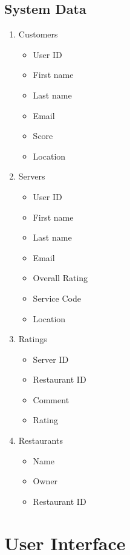 \documentclass{scrreprt}
\begin{document}
\section{System Data}
\begin{enumerate}
	\item Customers
	\begin{itemize}
		\item User ID
		\item First name
		\item Last name
		\item Email
		\item Score
		\item Location
	\end{itemize}
	\item Servers
	\begin{itemize}
		\item User ID
		\item First name
		\item Last name
		\item Email
		\item Overall Rating
		\item Service Code
		\item Location
	\end{itemize}
	\item Ratings
	\begin{itemize}
		\item Server ID
		\item Restaurant ID
		\item Comment
		\item Rating
	\end{itemize}
	\item Restaurants
	\begin{itemize}
		\item Name
		\item Owner
		\item Restaurant ID
	\end{itemize}
\end{enumerate}

\chapter{User Interface}
\end{document}
